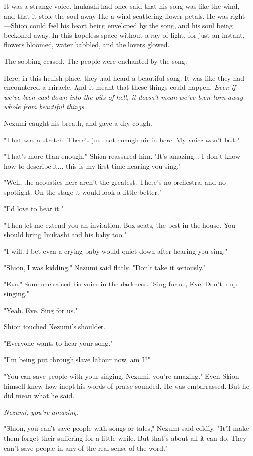 It was a strange voice. Inukashi had once said that his song was like
the wind, and that it stole the soul away like a wind scattering flower
petals. He was right---Shion could feel his heart being enveloped by the
song, and his soul being beckoned away. In this hopeless space without a
ray of light, for just an instant, flowers bloomed, water babbled, and
the lovers glowed.

The sobbing ceased. The people were enchanted by the song.

Here, in this hellish place, they had heard a beautiful song. It was
like they had encountered a miracle. And it meant that these things
could happen. \emph{Even if we've been cast down into the pits of hell, it
doesn't mean we've been torn away whole from beautiful things.}

Nezumi caught his breath, and gave a dry cough.

"That was a stretch. There's just not enough air in here. My voice won't
last."

"That's more than enough," Shion reassured him. "It's amazing... I don't
know how to describe it... this is my first time hearing you sing."

"Well, the acoustics here aren't the greatest. There's no orchestra, and
no spotlight. On the stage it would look a little better."

"I'd love to hear it."

"Then let me extend you an invitation. Box seats, the best in the house.
You should bring Inukashi and his baby too."

"I will. I bet even a crying baby would quiet down after hearing you
sing."

"Shion, I was kidding," Nezumi said flatly. "Don't take it seriously."

"Eve." Someone raised his voice in the darkness. "Sing for us, Eve.
Don't stop singing."

"Yeah, Eve. Sing for us."

Shion touched Nezumi's shoulder.

"Everyone wants to hear your song."

"I'm being put through slave labour now, am I?"

"You can save people with your singing. Nezumi, you're amazing." Even
Shion himself knew how inept his words of praise sounded. He was
embarrassed. But he did mean what he said.

\emph{Nezumi, you're amazing.}

"Shion, you can't save people with songs or tales," Nezumi said coldly.
"It'll make them forget their suffering for a little while. But that's
about all it can do. They can't save people in any of the real sense of
the word."

